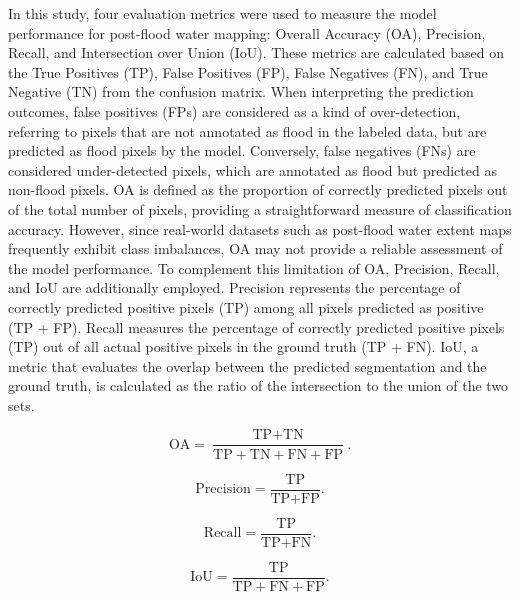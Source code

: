 \documentclass[preprint,12pt,authoryear]{elsarticle}
\begin{document}
In this study, four evaluation metrics were used to measure the model performance for post-flood water mapping: Overall Accuracy (OA), Precision, Recall, and Intersection over Union (IoU). These metrics are calculated based on the True Positives (TP), False Positives (FP), False Negatives (FN), and True Negative (TN) from the confusion matrix. When interpreting the prediction outcomes, false positives (FPs) are considered as a kind of over-detection, referring to pixels that are not annotated as flood in the labeled data, but are predicted as flood pixels by the model. Conversely, false negatives (FNs) are considered under-detected pixels, which are annotated as flood but predicted as non-flood pixels. OA is defined as the proportion of correctly predicted pixels out of the total number of pixels, providing a straightforward measure of classification accuracy. However, since real-world datasets such as post-flood water extent maps frequently exhibit class imbalances, OA may not provide a reliable assessment of the model performance. To complement this limitation of OA, Precision, Recall, and IoU are additionally employed. Precision represents the percentage of correctly predicted positive pixels (TP) among all pixels predicted as positive (TP + FP). Recall measures the percentage of correctly predicted positive pixels (TP) out of all actual positive pixels in the ground truth (TP + FN). IoU, a metric that evaluates the overlap between the predicted segmentation and the ground truth, is calculated as the ratio of the intersection to the union of the two sets.

\begin{equation}
\label{eq10}
    \text{OA} = \frac{\text{TP} + \text{TN}}{\text{TP} + \text{TN} + \text{FN} + \text{FP}} \text{.}
\end{equation}

\begin{equation}
\label{eq11}
    \text{Precision} = \frac{\text{TP}}{\text{TP} + \text{FP} } \text{.}
\end{equation}

\begin{equation}
\label{eq12}
    \text{Recall} = \frac{\text{TP}}{\text{TP} + \text{FN} } \text{.}
\end{equation}

\begin{equation}
\label{eq13}
    \text{IoU} = \frac{\text{TP}}{\text{TP} + \text{FN} + \text{FP} } \text{.}
\end{equation}
\end{document}
